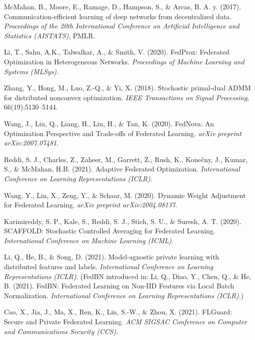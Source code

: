 \documentclass[12pt,a4paper]{report}
\begin{document}
\begin{thebibliography}{99}
	
	McMahan, B., Moore, E., Ramage, D., Hampson, S., \& Arcas, B. A. y. (2017). Communication-efficient learning of deep networks from decentralized data. \textit{Proceedings of the 20th International Conference on Artificial Intelligence and Statistics (AISTATS)}, PMLR.
	
	Li, T., Sahu, A.K., Talwalkar, A., \& Smith, V. (2020). FedProx: Federated Optimization in Heterogeneous Networks. \textit{Proceedings of Machine Learning and Systems (MLSys)}.
	
	Zhang, Y., Hong, M., Luo, Z.-Q., \& Yi, X. (2018). Stochastic primal-dual ADMM for distributed nonconvex optimization. \textit{IEEE Transactions on Signal Processing}, 66(19):5130–5144.
	
	Wang, J., Liu, Q., Liang, H., Liu, H., \& Tan, K. (2020). FedNova: An Optimization Perspective and Trade-offs of Federated Learning. \textit{arXiv preprint arXiv:2007.07481}.
	
	Reddi, S. J., Charles, Z., Zaheer, M., Garrett, Z., Rush, K., Kone\v{c}ny, J., Kumar, S., \& McMahan, H.B. (2021). Adaptive Federated Optimization. \textit{International Conference on Learning Representations (ICLR)}.
	
	
	Wang, Y., Lin, X., Zeng, Y., \& Schaar, M. (2020). Dynamic Weight Adjustment for Federated Learning. \textit{arXiv preprint arXiv:2004.08137}.
	
	Karimireddy, S. P., Kale, S., Reddi, S. J., Stich, S. U., \& Suresh, A. T. (2020). SCAFFOLD: Stochastic Controlled Averaging for Federated Learning. \textit{International Conference on Machine Learning (ICML)}.
	
	Li, Q., He, B., \& Song, D. (2021). Model-agnostic private learning with distributed features and labels. \textit{International Conference on Learning Representations (ICLR)}.  
	(FedBN introduced in: Li, Q., Diao, Y., Chen, Q., \& He, B. (2021). FedBN: Federated Learning on Non-IID Features via Local Batch Normalization. \textit{International Conference on Learning Representations (ICLR)}.)
	
	Cao, X., Jia, J., Ma, X., Ren, K., Lin, S.-W., \& Zhou, X. (2021). FLGuard: Secure and Private Federated Learning. \textit{ACM SIGSAC Conference on Computer and Communications Security (CCS)}.
	
\end{thebibliography}
\end{document}
